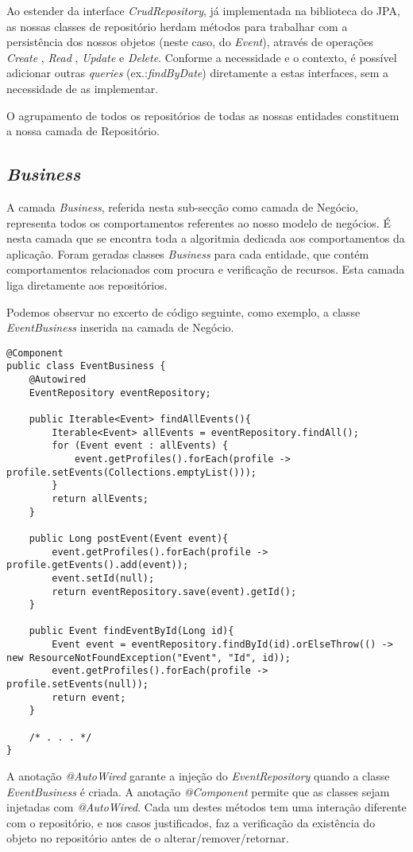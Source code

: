 Ao estender da interface \emph{CrudRepository}, já implementada na biblioteca do JPA, as nossas classes de repositório herdam métodos para trabalhar com a persistência dos nossos objetos (neste caso, do \emph{Event}), através de operações \emph{Create} , \emph{Read} , \emph{Update} e \emph{Delete}. Conforme a necessidade e o contexto, é possível adicionar
outras \emph{queries} (ex.:\emph{findByDate}) diretamente a estas interfaces, sem a necessidade de as implementar. 

O agrupamento de todos os repositórios de todas as nossas entidades constituem a nossa camada de Repositório.

\subsection{\emph{Business}} \label{sec313}
A camada \emph{Business}, referida nesta sub-secção como camada de Negócio, representa todos os comportamentos referentes ao nosso modelo de negócios.
É nesta camada que se encontra toda a algoritmia dedicada aos comportamentos da aplicação. Foram geradas classes \emph{Business} para cada entidade, que contém comportamentos relacionados com procura e verificação de recursos. Esta camada liga diretamente aos repositórios.

Podemos observar no excerto de código seguinte, como exemplo, a classe \emph{EventBusiness} inserida na camada de Negócio.
\begin{lstlisting}
@Component
public class EventBusiness {
	@Autowired
	EventRepository eventRepository;
	
	public Iterable<Event> findAllEvents(){
		Iterable<Event> allEvents = eventRepository.findAll();
		for (Event event : allEvents) {
			event.getProfiles().forEach(profile -> profile.setEvents(Collections.emptyList()));
		}
		return allEvents;
	}
	
	public Long postEvent(Event event){
		event.getProfiles().forEach(profile -> profile.getEvents().add(event));
		event.setId(null);
		return eventRepository.save(event).getId();
	}
	
	public Event findEventById(Long id){
		Event event = eventRepository.findById(id).orElseThrow(() -> new ResourceNotFoundException("Event", "Id", id));
		event.getProfiles().forEach(profile -> profile.setEvents(null));
		return event;
	}
	
	/* . . . */
}
\end{lstlisting}

A anotação \emph{@AutoWired} garante a injeção do \emph{EventRepository} quando a classe \emph{EventBusiness} é criada. A anotação \emph{@Component} permite que as classes sejam injetadas com \emph{@AutoWired}. Cada um destes métodos tem uma interação diferente com o repositório, e nos casos justificados, faz a verificação da existência do objeto no repositório antes de o alterar/remover/retornar.

